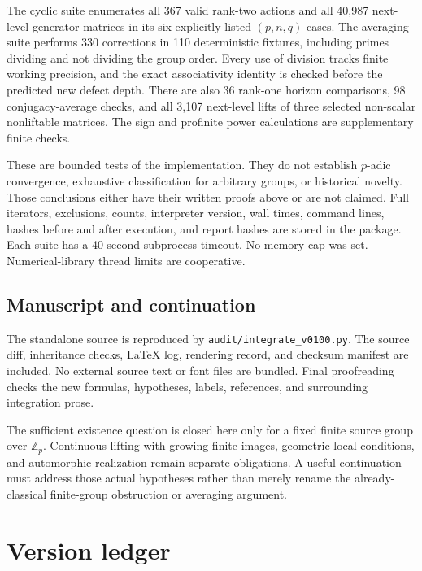 \documentclass[11pt]{article}
\theoremstyle{definition}
\theoremstyle{remark}
\begin{document}
The cyclic suite enumerates all 367 valid rank-two actions and all 40,987 next-level generator matrices in its six explicitly listed $(p,n,q)$ cases. The averaging suite performs 330 corrections in 110 deterministic fixtures, including primes dividing and not dividing the group order. Every use of division tracks finite working precision, and the exact associativity identity is checked before the predicted new defect depth. There are also 36 rank-one horizon comparisons, 98 conjugacy-average checks, and all 3,107 next-level lifts of three selected non-scalar nonliftable matrices. The sign and profinite power calculations are supplementary finite checks.

These are bounded tests of the implementation. They do not establish $p$-adic convergence, exhaustive classification for arbitrary groups, or historical novelty. Those conclusions either have their written proofs above or are not claimed. Full iterators, exclusions, counts, interpreter version, wall times, command lines, hashes before and after execution, and report hashes are stored in the package. Each suite has a 40-second subprocess timeout. No memory cap was set. Numerical-library thread limits are cooperative.

\subsection{Manuscript and continuation}
The standalone source is reproduced by \texttt{audit/integrate\_v0100.py}. The source diff, inheritance checks, LaTeX log, rendering record, and checksum manifest are included. No external source text or font files are bundled. Final proofreading checks the new formulas, hypotheses, labels, references, and surrounding integration prose.

The sufficient existence question is closed here only for a fixed finite source group over $\mathbb Z_p$. Continuous lifting with growing finite images, geometric local conditions, and automorphic realization remain separate obligations. A useful continuation must address those actual hypotheses rather than merely rename the already-classical finite-group obstruction or averaging argument.

\section{Version ledger}
\end{document}

